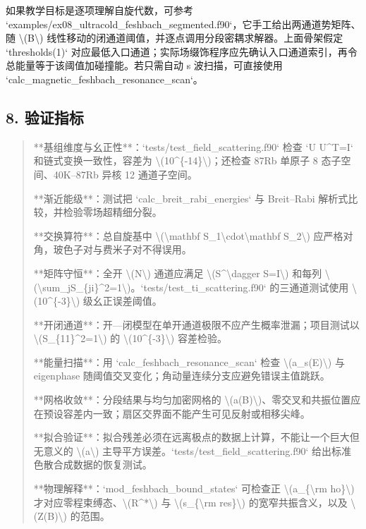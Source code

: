 \documentclass[UTF8,openany,11pt,fontset=fandol]{ctexbook}
\begin{document}
如果教学目标是逐项理解自旋代数，可参考
`examples/ex08\_ultracold\_feshbach\_segmented.f90`，它手工给出两通道势矩阵、随
\textbackslash(B\textbackslash)
线性移动的闭通道阈值，并逐点调用分段密耦求解器。上面骨架假定
`thresholds(1)`
对应最低入口通道；实际场缀饰程序应先确认入口通道索引，再令总能量等于该阈值加碰撞能。若只需自动
s 波扫描，可直接使用 `calc\_magnetic\_feshbach\_resonance\_scan`。

\subsection{\texorpdfstring{\textbf{8.
验证指标}}{8. 验证指标}}\label{ux9a8cux8bc1ux6307ux6807-2}

\begin{quote}
**基组维度与幺正性**：`tests/test\_field\_scattering.f90` 检查 `U
U\^{}T=I` 和链式变换一致性，容差为
\textbackslash(10\^{}\{-14\}\textbackslash)；还检查 87Rb 单原子 8
态子空间、40K--87Rb 异核 12 通道子空间。

**渐近能级**：测试把 `calc\_breit\_rabi\_energies` 与 Breit--Rabi
解析式比较，并检验零场超精细分裂。

**交换算符**：总自旋基中 \textbackslash(\textbackslash mathbf
S\_1\textbackslash cdot\textbackslash mathbf S\_2\textbackslash)
应严格对角，玻色子对与费米子对不得误用。

**矩阵守恒**：全开 \textbackslash(N\textbackslash) 通道应满足
\textbackslash(S\^{}\textbackslash dagger S=I\textbackslash) 和每列
\textbackslash(\textbackslash sum\_j\textbar S\_\{ji\}\textbar\^{}2=1\textbackslash)。`tests/test\_ti\_scattering.f90`
的三通道测试使用 \textbackslash(10\^{}\{-3\}\textbackslash)
级幺正误差阈值。

**开闭通道**：开---闭模型在单开通道极限不应产生概率泄漏；项目测试以
\textbackslash(\textbar S\_\{11\}\textbar\^{}2=1\textbackslash) 的
\textbackslash(10\^{}\{-3\}\textbackslash) 容差检验。

**能量扫描**：用 `calc\_feshbach\_resonance\_scan` 检查
\textbackslash(a\_s(E)\textbackslash) 与 eigenphase
随阈值交叉变化；角动量连续分支应避免错误主值跳跃。

**网格收敛**：分段结果与均匀加密网格的
\textbackslash(a(B)\textbackslash)、零交叉和共振位置应在预设容差内一致；扇区交界面不能产生可见反射或相移尖峰。

**拟合验证**：拟合残差必须在远离极点的数据上计算，不能让一个巨大但无意义的
\textbackslash(\textbar a\textbar\textbackslash)
主导平方误差。`tests/test\_field\_scattering.f90`
给出标准色散合成数据的恢复测试。

**物理解释**：`mod\_feshbach\_bound\_states` 可检查正
\textbackslash(a\_\{\textbackslash rm ho\}\textbackslash)
才对应零程束缚态、\textbackslash(R\^{}*\textbackslash) 与
\textbackslash(s\_\{\textbackslash rm res\}\textbackslash)
的宽窄共振含义，以及 \textbackslash(Z(B)\textbackslash) 的范围。
\end{quote}
\end{document}

